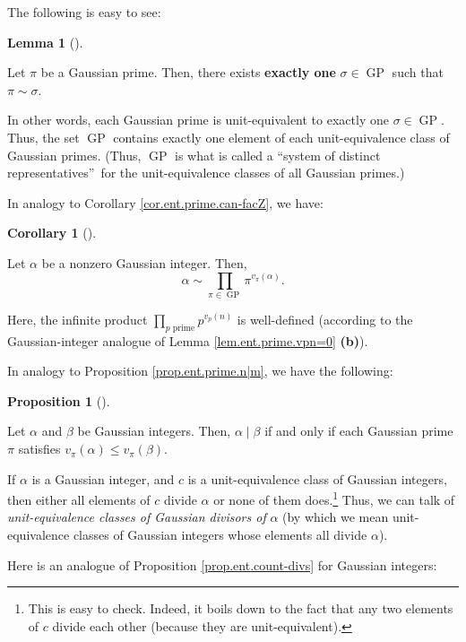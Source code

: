 \documentclass[numbers=enddot,12pt,final,onecolumn,notitlepage]{scrartcl}%
\numberwithin{exer}{subsection}
\theoremstyle{definition}
\newtheorem{lem}[theo]{Lemma}
\newenvironment{lemma}[1][]
{\begin{lem}[#1]\begin{leftbar}}
{\end{leftbar}\end{lem}}
\newtheorem{prop}[theo]{Proposition}
\newenvironment{proposition}[1][]
{\begin{prop}[#1]\begin{leftbar}}
{\end{leftbar}\end{prop}}
\newtheorem{coro}[theo]{Corollary}
\newenvironment{corollary}[1][]
{\begin{coro}[#1]\begin{leftbar}}
{\end{leftbar}\end{coro}}
\let\prodnonlimits\prod
\renewcommand{\prod}{\prodnonlimits\limits}
\begin{document}
The following is easy to see:

\begin{lemma}
\label{lem.Z[i].prime.GP-reps}Let $\pi$ be a Gaussian prime. Then, there
exists \textbf{exactly one} $\sigma\in\operatorname*{GP}$ such that $\pi
\sim\sigma$.
\end{lemma}

In other words, each Gaussian prime is unit-equivalent to exactly one
$\sigma\in\operatorname*{GP}$. Thus, the set $\operatorname*{GP}$ contains
exactly one element of each unit-equivalence class of Gaussian primes. (Thus,
$\operatorname*{GP}$ is what is called a \textquotedblleft system of distinct
representatives\textquotedblright\ for the unit-equivalence classes of all
Gaussian primes.)

In analogy to Corollary \ref{cor.ent.prime.can-facZ}, we have:

\begin{corollary}
\label{cor.Z[i].prime.can-facZ}Let $\alpha$ be a nonzero Gaussian integer.
Then,
\[
\alpha\sim\prod_{\pi\in\operatorname*{GP}}\pi^{v_{\pi}\left(  \alpha\right)
}.
\]


Here, the infinite product $\prod_{p\text{ prime}}p^{v_{p}\left(  n\right)  }$
is well-defined (according to the Gaussian-integer analogue of Lemma
\ref{lem.ent.prime.vpn=0} \textbf{(b)}).
\end{corollary}

In analogy to Proposition \ref{prop.ent.prime.n|m}, we have the following:

\begin{proposition}
\label{prop.Z[i].prime.n|m}Let $\alpha$ and $\beta$ be Gaussian integers.
Then, $\alpha\mid\beta$ if and only if each Gaussian prime $\pi$ satisfies
$v_{\pi}\left(  \alpha\right)  \leq v_{\pi}\left(  \beta\right)  $.
\end{proposition}

If $\alpha$ is a Gaussian integer, and $c$ is a unit-equivalence class of
Gaussian integers, then either all elements of $c$ divide $\alpha$ or none of
them does.\footnote{This is easy to check. Indeed, it boils down to the fact
that any two elements of $c$ divide each other (because they are
unit-equivalent).} Thus, we can talk of \textit{unit-equivalence classes of
Gaussian divisors of }$\alpha$ (by which we mean unit-equivalence classes of
Gaussian integers whose elements all divide $\alpha$).

Here is an analogue of Proposition \ref{prop.ent.count-divs} for Gaussian integers:
\end{document}
